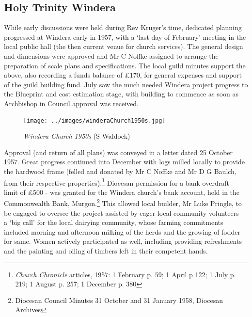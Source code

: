 \subsection{Holy Trinity Windera}



While early discussions were held during Rev Kruger's time, dedicated planning progressed at Windera early in 1957, with a `last day of February' meeting in the local public hall (the then current venue for church services). The general design and dimensions were approved and Mr C Noffke assigned to arrange the preparation of scale plans and specifications. The local guild minutes support the above, also recording a funds balance of \pounds170, for general expenses and support of the guild building fund. July saw the much needed Windera project progress to the Blueprint and cost estimation stage, with building to commence as soon as Archbishop in Council approval was received.









\begin{figure}[!htb]
\begin{center}
\texttt{[image: ../images/winderaChurch1950s.jpg]}
\caption{{\itshape Windera Church 1950s} {\scriptsize(S Waldock)}}
\end{center}
\end{figure}




Approval (and return of all plans) was conveyed in a letter dated 25 October 1957. Great progress continued into December with logs milled locally to provide the hardwood frame (felled and donated by Mr C Noffke and Mr D G Baulch, from their respective properties).\footnote{\emph{Church Chronicle} articles, 1957: 1 February p. 59; 1 April p 122; 1 July p. 219; 1 August p. 257; 1 December p. 380} Diocesan permission for a bank overdraft - limit of \pounds500 - was granted for the Windera church's bank account, held in the Commonwealth Bank, Murgon.\footnote{Diocesan Council Minutes 31 October and 31 January 1958, Diocesan Archives} This allowed local builder, Mr Luke Pringle, to be engaged to oversee the project assisted by eager local community volunteers -- a `big call' for the local dairying community, whose farming commitments included morning and afternoon milking of the herds and the growing of fodder for same. Women actively participated as well, including providing refreshments and the painting and oiling of timbers left in their competent hands.



